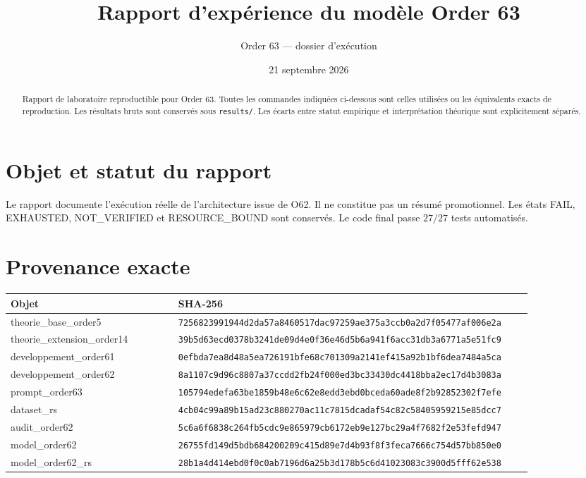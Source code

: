 \documentclass[11pt,a4paper]{article}
\newcommand{\code}[1]{\texttt{#1}}
\begin{document}
\title{Rapport d’expérience du modèle Order 63}\author{Order 63 — dossier d’exécution}\date{21 septembre 2026}\maketitle

\begin{abstract}
Rapport de laboratoire reproductible pour Order 63. Toutes les commandes indiquées ci-dessous sont celles utilisées ou les équivalents exacts de reproduction. Les résultats bruts sont conservés sous \code{results/}. Les écarts entre statut empirique et interprétation théorique sont explicitement séparés.
\end{abstract}

\section{Objet et statut du rapport}
Le rapport documente l’exécution réelle de l’architecture issue de O62. Il ne constitue pas un résumé promotionnel. Les états FAIL, EXHAUSTED, NOT\_VERIFIED et RESOURCE\_BOUND sont conservés. Le code final passe \(27/27\) tests automatisés.

\section{Provenance exacte}
\begin{longtable}{p{0.30\linewidth}p{0.56\linewidth}}
\toprule
Objet & SHA-256\\
\midrule
theorie\_base\_order5 & \code{7256823991944d2da57a8460517dac97259ae375a3ccb0a2d7f05477af006e2a}\\
theorie\_extension\_order14 & \code{39b5d63ecd0378b3241de09d4e0f36e46d5b6a941f6acc31db3a6771a5e51fc9}\\
developpement\_order61 & \code{0efbda7ea8d48a5ea726191bfe68c701309a2141ef415a92b1bf6dea7484a5ca}\\
developpement\_order62 & \code{8a1107c9d96c8807a37ccdd2fb24f000ed3bc33430dc4418bba2ec17d4b3083a}\\
prompt\_order63 & \code{105794edefa63be1859b48e6c62e8edd3ebd0bceda60ade8f2b92852302f7efe}\\
dataset\_rs & \code{4cb04c99a89b15ad23c880270ac11c7815dcadaf54c82c58405959215e85dcc7}\\
audit\_order62 & \code{5c6a6f6838c264fb5cdc9e865979cb6172eb9e127bc29a4f7682f2e53fefd947}\\
model\_order62 & \code{26755fd149d5bdb684200209c415d89e7d4b93f8f3feca7666c754d57bb850e0}\\
model\_order62\_rs & \code{28b1a4d414ebd0f0c0ab7196d6a25b3d178b5c6d41023083c3900d5fff62e538}\\
\bottomrule
\end{longtable}
\end{document}
